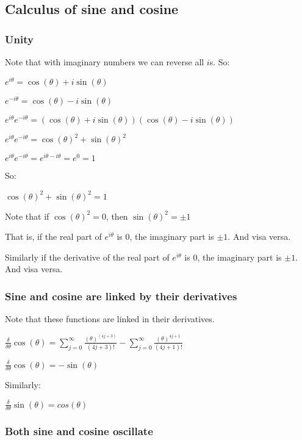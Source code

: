 
\subsection{Calculus of sine and cosine}

\subsubsection{Unity}

Note that with imaginary numbers we can reverse all \(i\)s. So:

$e^{i\theta }=\cos (\theta )+i\sin (\theta )$

$e^{-i\theta }=\cos (\theta )-i\sin (\theta )$

$e^{i\theta }e^{-i\theta }=(\cos (\theta )+i\sin (\theta ))(\cos (\theta )-i\sin (\theta ))$

$e^{i\theta }e^{-i\theta }=\cos (\theta )^2+\sin (\theta )^2$

$e^{i\theta }e^{-i\theta }=e^{i\theta -i\theta }=e^0=1$

So:

$\cos (\theta )^2+\sin (\theta )^2=1$

Note that if \(\cos (\theta )^2=0\), then \(\sin (\theta )^2=\pm 1\)

That is, if the real part of \(e^{i\theta }\) is \(0\), the imaginary part is \(\pm 1\). And visa versa.

Similarly if the derivative of the real part of \(e^{i\theta }\) is \(0\), the imaginary part is \(\pm 1\). And visa versa.

\subsubsection{Sine and cosine are linked by their derivatives}

Note that these functions are linked in their derivatives.

$\frac{\delta }{\delta \theta }\cos (\theta )=\sum_{j=0}^\infty \frac{(\theta )^{(4j+3)}}{(4j+3)!}-\sum_{j=0}^\infty \frac{(\theta )^{4j+1}}{(4j+1)!}$

$\frac{\delta }{\delta \theta }\cos (\theta )=-\sin (\theta )$

Similarly:

$\frac{\delta }{\delta \theta }\sin (\theta )=cos(\theta )$

\subsubsection{Both sine and cosine oscillate}

